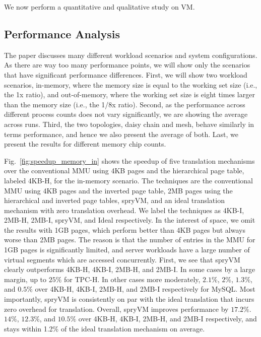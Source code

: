 
We now perform a quantitative and qualitative study on VM.

\subsection{Performance Analysis}

The paper discusses many different workload scenarios and system configurations. As there are way too many performance points, we will show only the scenarios that have significant performance differences. First, we will show two workload scenarios, in-memory, where the memory size is equal to the working set size (i.e., the 1x ratio), and out-of-memory, where the working set size is eight times larger than the memory size (i.e., the 1/8x ratio). Second, as the performance across different process counts does not vary significantly, we are showing the average across runs. Third, the two topologies, daisy chain and mesh, behave similarly in terms performance, and hence we also present the average of both. Last, we present the results for different memory chip counts.

Fig.~\ref{fig:speedup_memory_in} shows the speedup of five translation mechanisms over the conventional MMU using 4KB pages and the hierarchical page table, labeled 4KB-H, for the in-memory scenario. The techniques are the conventional MMU using 4KB pages and the inverted page table, 2MB pages using the hierarchical and inverted page tables, spryVM, and an ideal translation mechanism with zero translation overhead. We label the techniques as 4KB-I, 2MB-H, 2MB-I, spryVM, and Ideal respectively. In the interest of space, we omit the results with 1GB pages, which perform better than 4KB pages but always worse than 2MB pages. The reason is that the number of entries in the MMU for 1GB pages is significantly limited, and server workloads have a large number of virtual segments which are accessed concurrently. First, we see that spryVM clearly outperforms 4KB-H, 4KB-I, 2MB-H, and 2MB-I. In some cases by a large margin, up to $25\%$ for TPC-H. In other cases more moderately, $2.1\%$, $2\%$, $1.3\%$, and $0.5\%$ over 4KB-H, 4KB-I, 2MB-H, and 2MB-I respectively for MySQL. Most importantly, spryVM is consistently on par with the ideal translation that incurs zero overhead for translation. Overall, spryVM improves performance by $17.2\%$. $14\%$, $12.3\%$, and $10.5\%$ over 4KB-H, 4KB-I, 2MB-H, and 2MB-I respectively, and stays within 1.2\% of the ideal translation mechanism on average.

